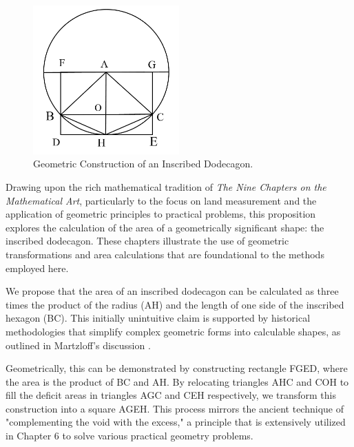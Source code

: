\documentclass[10pt]{article}
\begin{document}
\begin{figure}[ht!]
\centering
\includegraphics[width=0.5\textwidth]{./images/sec2.1-dodecagon.jpeg}
\caption{Geometric Construction of an Inscribed Dodecagon.}
\label{fig:dodecagon}
\end{figure}

\vspace{7pt}

Drawing upon the rich mathematical tradition of \textit{The Nine Chapters on the Mathematical Art}, particularly to the focus on land measurement and the application of geometric principles to practical problems, this proposition explores the calculation of the area of a geometrically significant shape: the inscribed dodecagon. These chapters illustrate the use of geometric transformations and area calculations that are foundational to the methods employed here.

\vspace{7pt}

We propose that the area of an inscribed dodecagon can be calculated as three times the product of the radius (AH) and the length of one side of the inscribed hexagon (BC). This initially unintuitive claim is supported by historical methodologies that simplify complex geometric forms into calculable shapes, as outlined in Martzloff's discussion \autocite[p.~278]{Martzloff_2006}.

\vspace{7pt}

Geometrically, this can be demonstrated by constructing rectangle FGED, where the area is the product of BC and AH. By relocating triangles AHC and COH to fill the deficit areas in triangles AGC and CEH respectively, we transform this construction into a square AGEH. This process mirrors the ancient technique of "complementing the void with the excess," a principle that is extensively utilized in Chapter 6 to solve various practical geometry problems.
\end{document}
